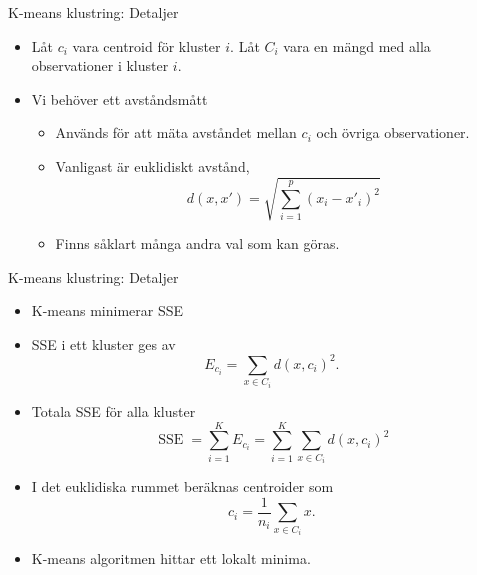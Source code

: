 \documentclass[10pt,english]{beamer}
\begin{document}
\begin{frame}{K-means klustring: Detaljer}

    \begin{itemize}
        \item Låt $c_i$ vara centroid för kluster $i$. Låt $C_i$ vara en mängd med alla observationer i kluster $i$.
        \item Vi behöver ett avståndsmått
        \begin{itemize}
            \item Används för att mäta avståndet mellan $c_i$ och övriga observationer.
            \item Vanligast är euklidiskt avstånd,
            \begin{equation*}
                d(x,x') = \sqrt{\sum_{i=1}^{p}(x_i - x'_i)^2}
            \end{equation*}
            \item Finns såklart många andra val som kan göras.
        \end{itemize}
    \end{itemize}
    
\end{frame}

\begin{frame}{K-means klustring: Detaljer}

    \begin{itemize}
        \item K-means minimerar SSE
        \item SSE i ett kluster ges av
        \begin{equation*}
            E_{c_i} = \sum_{x \in C_i} d(x, c_i)^2.
        \end{equation*}
        \item Totala SSE för alla kluster
        \begin{equation*}
            \operatorname{SSE} = \sum_{i=1}^{K} E_{c_i} = \sum_{i=1}^{K} \sum_{x \in C_i} d(x, c_i)^2
        \end{equation*}
        \item I det euklidiska rummet beräknas centroider som
        \begin{equation*}
            c_i = \frac{1}{n_i} \sum_{x \in C_i} x.
        \end{equation*}
        \item K-means algoritmen hittar ett lokalt minima.
    \end{itemize}
    
\end{frame}
\end{document}
